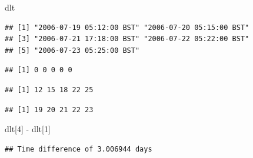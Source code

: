 \documentclass[]{article}
\newenvironment{Shaded}{\begin{snugshade}}{\end{snugshade}}
\newcommand{\DecValTok}[1]{\textcolor[rgb]{0.00,0.00,0.81}{#1}}
\newcommand{\NormalTok}[1]{#1}
\newcommand{\SpecialCharTok}[1]{\textcolor[rgb]{0.00,0.00,0.00}{#1}}
\begin{document}
\begin{Shaded}
\begin{Highlighting}[]
\NormalTok{dlt}
\end{Highlighting}
\end{Shaded}

\begin{verbatim}
## [1] "2006-07-19 05:12:00 BST" "2006-07-20 05:15:00 BST"
## [3] "2006-07-21 17:18:00 BST" "2006-07-22 05:22:00 BST"
## [5] "2006-07-23 05:25:00 BST"
\end{verbatim}

\begin{Shaded}
\end{Shaded}

\begin{verbatim}
## [1] 0 0 0 0 0
\end{verbatim}

\begin{Shaded}
\end{Shaded}

\begin{verbatim}
## [1] 12 15 18 22 25
\end{verbatim}

\begin{Shaded}
\end{Shaded}

\begin{verbatim}
## [1] 19 20 21 22 23
\end{verbatim}

\begin{Shaded}
\begin{Highlighting}[]
\NormalTok{dlt[}\DecValTok{4}\NormalTok{] }\SpecialCharTok{{-}}\NormalTok{ dlt[}\DecValTok{1}\NormalTok{]}
\end{Highlighting}
\end{Shaded}

\begin{verbatim}
## Time difference of 3.006944 days
\end{verbatim}
\end{document}

